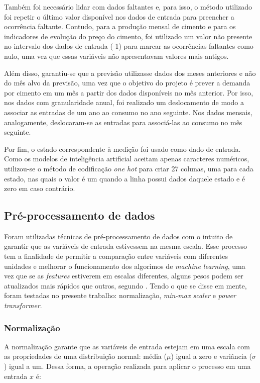 Também foi necessário lidar com dados faltantes e, para isso, o método utilizado foi
repetir o último valor disponível nos dados de entrada para
preencher a ocorrência faltante. Contudo, para a produção mensal de cimento e para os 
indicadores de evolução do preço do cimento, foi utilizado um valor não 
presente no intervalo dos dados de entrada (-1) para marcar as ocorrências 
faltantes como nulo, uma vez que essas variáveis não apresentavam 
valores mais antigos.

Além disso, garantiu-se que a previsão
 utilizasse dados dos meses anteriores e não do mês alvo da
previsão, uma vez que o objetivo do projeto é prever a demanda
por cimento em um mês a partir dos dados disponíveis no mês anterior.
Por isso, nos dados com granularidade anual, foi realizado um 
deslocamento de modo a associar as entradas de um ano ao consumo no 
ano seguinte. Nos dados mensais, analogamente, deslocaram-se as entradas 
para associá-las ao consumo no mês seguinte.

Por fim, o estado correspondente à medição foi usado como dado de entrada. 
Como os modelos de inteligência artificial aceitam apenas caracteres numéricos,
utilizou-se o método de codificação \textit{one hot} para criar 27 colunas, uma
para cada estado, nas quais o valor é um quando a linha possui dados daquele estado 
e é zero em caso contrário.


\subsection{Pré-processamento de dados}
\label{sec:norm_dados}

Foram utilizadas técnicas de pré-processamento de dados 
com o intuito de garantir que as variáveis de entrada 
estivessem na mesma escala. Esse processo tem a finalidade de permitir a comparação 
entre variáveis com diferentes unidades e melhorar o funcionamento dos 
algorimos de \textit{machine learning}, uma vez que se as \textit{features} estiverem em escalas diferentes,
alguns pesos podem ser atualizados mais rápidos que outros, segundo \citet{Raschka}.
Tendo o que se disse em mente, foram testadas no presente trabalho: normalização, 
\textit{min-max scaler} e \textit{power transformer}.

\subsubsection{Normalização}

A normalização garante que as variáveis de entrada estejam em uma 
escala com as propriedades de uma distribuição normal: média ($\mu$)
igual a zero e variância ($\sigma$) igual a um. Dessa forma, a operação 
realizada para aplicar o processo em uma entrada $x$ é:

